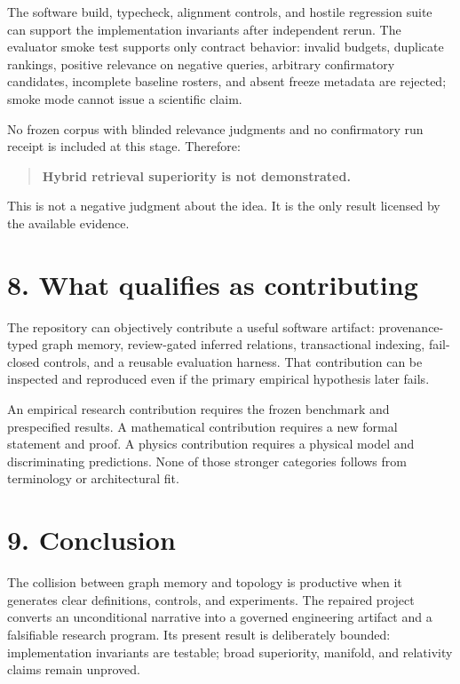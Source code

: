 \documentclass[
  english,
  11pt,
]{article}
\begin{document}
The software build, typecheck, alignment controls, and hostile
regression suite can support the implementation invariants after
independent rerun. The evaluator smoke test supports only contract
behavior: invalid budgets, duplicate rankings, positive relevance on
negative queries, arbitrary confirmatory candidates, incomplete baseline
rosters, and absent freeze metadata are rejected; smoke mode cannot
issue a scientific claim.

No frozen corpus with blinded relevance judgments and no confirmatory
run receipt is included at this stage. Therefore:

\begin{quote}
\textbf{Hybrid retrieval superiority is not demonstrated.}
\end{quote}

This is not a negative judgment about the idea. It is the only result
licensed by the available evidence.

\section{8. What qualifies as
contributing}\label{what-qualifies-as-contributing}

The repository can objectively contribute a useful software artifact:
provenance- typed graph memory, review-gated inferred relations,
transactional indexing, fail-closed controls, and a reusable evaluation
harness. That contribution can be inspected and reproduced even if the
primary empirical hypothesis later fails.

An empirical research contribution requires the frozen benchmark and
prespecified results. A mathematical contribution requires a new formal
statement and proof. A physics contribution requires a physical model
and discriminating predictions. None of those stronger categories
follows from terminology or architectural fit.

\section{9. Conclusion}\label{conclusion}

The collision between graph memory and topology is productive when it
generates clear definitions, controls, and experiments. The repaired
project converts an unconditional narrative into a governed engineering
artifact and a falsifiable research program. Its present result is
deliberately bounded: implementation invariants are testable; broad
superiority, manifold, and relativity claims remain unproved.
\end{document}
